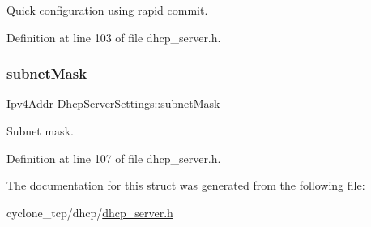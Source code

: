 Quick configuration using rapid commit. 



Definition at line 103 of file dhcp\+\_\+server.\+h.

\mbox{\label{structDhcpServerSettings_aeedb8313c969d8695966f58053ac54a0}} 
\subsubsection{\texorpdfstring{subnet\+Mask}{subnetMask}}
{\footnotesize\ttfamily \hyperlink{ipv4_8h_a411debb3d770caa0c06d3f73367da37f}{Ipv4\+Addr} Dhcp\+Server\+Settings\+::subnet\+Mask}



Subnet mask. 



Definition at line 107 of file dhcp\+\_\+server.\+h.



The documentation for this struct was generated from the following file\+:\begin{DoxyCompactItemize}
\item 
cyclone\+\_\+tcp/dhcp/\hyperlink{dhcp__server_8h}{dhcp\+\_\+server.\+h}\end{DoxyCompactItemize}
